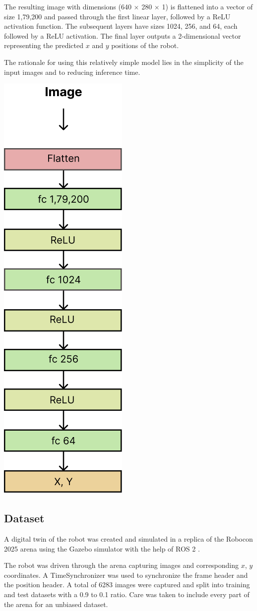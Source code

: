 \documentclass[a4paper]{article}
\begin{document}
\begin{multicols}{2}
\par \noindent
The resulting image with dimensions (640 $\times$ 280 $\times$ 1) is flattened into a vector 
of size 1,79,200 and passed through the first linear layer, followed by a ReLU activation function.
The subsequent layers have sizes 1024, 256, and 64, each followed by a ReLU activation. 
The final layer outputs a 2-dimensional vector representing the predicted $x$ and $y$ positions of the robot.

\par \noindent
The rationale for using this relatively simple model lies in the simplicity of the input images 
and to reducing inference time.

{ \centering
 \includegraphics[width=0.2\columnwidth]{results/model.png}\\
 \label{pinki}
}

\subsection{Dataset} 

\par \noindent
A digital twin of the robot was created and simulated in a replica of the Robocon 2025 arena 
using the Gazebo \cite{gazebo} simulator with the help of ROS 2 \cite{macenski2022ros2}. 

\par \noindent
The robot was driven through the arena capturing images and corresponding $x$, $y$ coordinates. A 
TimeSynchronizer was used to synchronize the frame header and the position header. A total of
6283 images were captured and split into training  and test datasets with a 0.9 to 0.1 ratio.
Care was taken to include every part of the arena for an unbiased dataset. 


\end{multicols}
\end{document}
